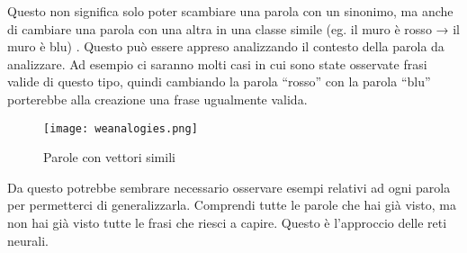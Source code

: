 Questo non significa solo poter scambiare una parola con un sinonimo, ma anche di cambiare una parola con una altra in una classe simile (eg. il muro è rosso → il muro è blu) \cite{Collobert11}. Questo può essere appreso analizzando il contesto della parola da analizzare. Ad esempio ci saranno molti casi in cui sono state osservate frasi valide di questo tipo, quindi cambiando la parola “rosso” con la parola “blu” porterebbe alla creazione una frase ugualmente valida. 
\begin{figure}[htb]
	\centering
	\texttt{[image: weanalogies.png]}
	\caption{Parole con vettori simili}
	\label{similarwords}
\end{figure}

Da questo potrebbe sembrare necessario osservare esempi relativi ad ogni parola per permetterci di generalizzarla. Comprendi tutte le parole che hai già visto, ma non hai già visto tutte le frasi che riesci a capire. Questo è l’approccio delle reti neurali.

